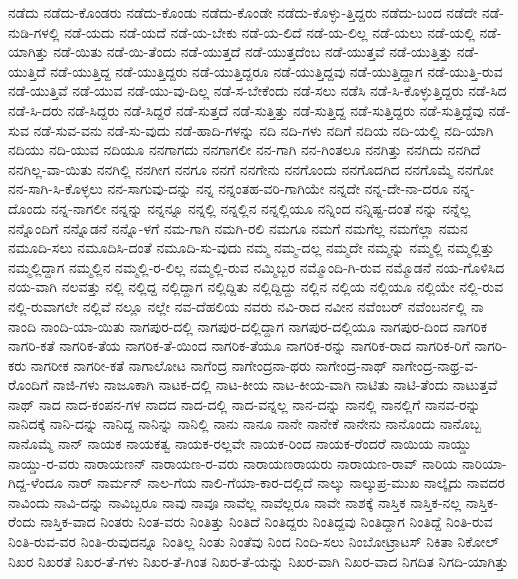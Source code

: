 {ನಡೆದು
ನಡೆದು-ಕೊಂಡರು
ನಡೆದು-ಕೊಂಡು
ನಡೆದು-ಕೊಂಡೇ
ನಡೆದು-ಕೊಳ್ಳು-ತ್ತಿದ್ದರು
ನಡೆದು-ಬಂದ
ನಡೆದೇ
ನಡೆ-ನುಡಿ-ಗಳಲ್ಲಿ
ನಡೆ-ಯದು
ನಡೆ-ಯದೆ
ನಡೆ-ಯ-ಬೇಕು
ನಡೆ-ಯ-ಲಿದೆ
ನಡೆ-ಯ-ಲಿಲ್ಲ
ನಡೆ-ಯಲು
ನಡೆ-ಯಲ್ಲಿ
ನಡೆ-ಯಾಗಿತ್ತು
ನಡೆ-ಯಿತು
ನಡೆ-ಯಿ-ತೆಂದು
ನಡೆ-ಯುತ್ತದೆ
ನಡೆ-ಯುತ್ತದೆಂಬ
ನಡೆ-ಯುತ್ತವೆ
ನಡೆ-ಯುತ್ತಿತ್ತು
ನಡೆ-ಯುತ್ತಿದೆ
ನಡೆ-ಯುತ್ತಿದ್ದ
ನಡೆ-ಯುತ್ತಿದ್ದರು
ನಡೆ-ಯುತ್ತಿದ್ದರೂ
ನಡೆ-ಯುತ್ತಿದ್ದವು
ನಡೆ-ಯುತ್ತಿದ್ದಾಗ
ನಡೆ-ಯುತ್ತಿ-ರುವ
ನಡೆ-ಯುತ್ತಿವೆ
ನಡೆ-ಯುವ
ನಡೆ-ಯು-ವು-ದಿಲ್ಲ
ನಡೆ-ಸ-ಬೇಕೆಂದು
ನಡೆ-ಸಲು
ನಡೆಸಿ
ನಡೆ-ಸಿ-ಕೊಳ್ಳುತ್ತಿದ್ದರು
ನಡೆ-ಸಿದ
ನಡೆ-ಸಿ-ದರು
ನಡೆ-ಸಿದ್ದರು
ನಡೆ-ಸಿದ್ದರೆ
ನಡೆ-ಸುತ್ತದೆ
ನಡೆ-ಸುತ್ತಿತ್ತು
ನಡೆ-ಸುತ್ತಿದ್ದ
ನಡೆ-ಸುತ್ತಿದ್ದರು
ನಡೆ-ಸುತ್ತಿದ್ದೆವು
ನಡೆ-ಸುವ
ನಡೆ-ಸುವ-ವನು
ನಡೆ-ಸು-ವುದು
ನಡೆ-ಹಾದಿ-ಗಳನ್ನು
ನದಿ
ನದಿ-ಗಳು
ನದಿಗೆ
ನದಿಯ
ನದಿ-ಯಲ್ಲಿ
ನದಿ-ಯಾಗಿ
ನದಿಯು
ನದಿ-ಯುವ
ನದಿಯೂ
ನನಗಾಗದು
ನನಗಾಗಲೀ
ನನ-ಗಾಗಿ
ನನ-ಗಿಂತಲೂ
ನನಗಿತ್ತು
ನನಗಿದು
ನನಗಿದೆ
ನನಗಿಲ್ಲ-ವಾ-ಯಿತು
ನನಗಿಲ್ಲಿ
ನನಗೀಗ
ನನಗೂ
ನನಗೆ
ನನಗೇನು
ನನಗೊಂದು
ನನಗೊದಗಿದ
ನನಗೊಮ್ಮೆ
ನನಗೋ
ನನ-ಸಾಗಿ-ಸಿ-ಕೊಳ್ಳಲು
ನನ-ಸಾಗುವು-ದನ್ನು
ನನ್ನ
ನನ್ನಂತಹ-ವರಿ-ಗಾಗಿಯೇ
ನನ್ನದೇ
ನನ್ನ-ದೇ-ನಾ-ದರೂ
ನನ್ನ-ದೊಂದು
ನನ್ನ-ನಾಗಲೀ
ನನ್ನನ್ನು
ನನ್ನನ್ನೂ
ನನ್ನಲ್ಲಿ
ನನ್ನಲ್ಲಿನ
ನನ್ನಲ್ಲಿಯೂ
ನನ್ನಿಂದ
ನನ್ನಿಷ್ಟ-ದಂತೆ
ನನ್ನು
ನನ್ನೆಲ್ಲ
ನನ್ನೊಂದಿಗೆ
ನನ್ನೊಡನೆ
ನನ್ನೊ-ಳಗೆ
ನಮ-ಗಾಗಿ
ನಮಗಿ-ರಲಿ
ನಮಗೂ
ನಮಗೆ
ನಮಗೆಲ್ಲ
ನಮಗೆಲ್ಲಾ
ನಮನ
ನಮೂದಿ-ಸಲು
ನಮೂದಿಸಿ-ದಂತೆ
ನಮೂದಿ-ಸು-ವುದು
ನಮ್ಮ
ನಮ್ಮ-ದಲ್ಲ
ನಮ್ಮದೇ
ನಮ್ಮನ್ನು
ನಮ್ಮಲ್ಲಿ
ನಮ್ಮಲ್ಲಿತ್ತು
ನಮ್ಮಲ್ಲಿದ್ದಾಗ
ನಮ್ಮಲ್ಲಿನ
ನಮ್ಮಲ್ಲಿ-ರ-ಲಿಲ್ಲ
ನಮ್ಮಲ್ಲಿ-ರುವ
ನಮ್ಮಿಬ್ಬರ
ನಮ್ಮೊಂದಿ-ಗಿ-ರುವ
ನಮ್ಮೊಡನೆ
ನಯ-ಗೊಳಿಸಿದ
ನಯ-ವಾಗಿ
ನಲವತ್ತು
ನಲ್ಲಿ
ನಲ್ಲಿದ್ದ
ನಲ್ಲಿದ್ದಾಗ
ನಲ್ಲಿದ್ದಿತು
ನಲ್ಲಿದ್ದಿದ್ದು
ನಲ್ಲಿನ
ನಲ್ಲಿಯ
ನಲ್ಲಿಯೂ
ನಲ್ಲಿಯೇ
ನಲ್ಲಿ-ರುವ
ನಲ್ಲಿ-ರುವಾಗಲೇ
ನಲ್ಲಿವೆ
ನಲ್ಲೂ
ನಲ್ಲೇ
ನವ-ದೆಹಲಿಯ
ನವರು
ನವಿ-ರಾದ
ನವೀನ
ನವೆಂಬರ್
ನವೆಂಬರ್ನಲ್ಲಿ
ನಾ
ನಾಂದಿ
ನಾಂದಿ-ಯಾ-ಯಿತು
ನಾಗಪುರ-ದಲ್ಲಿ
ನಾಗಪುರ-ದಲ್ಲಿದ್ದಾಗ
ನಾಗಪುರ-ದಲ್ಲಿಯೂ
ನಾಗಪುರ-ದಿಂದ
ನಾಗರಿಕ
ನಾಗರಿ-ಕತೆ
ನಾಗರಿಕ-ತೆಯ
ನಾಗರಿಕ-ತೆ-ಯಿಂದ
ನಾಗರಿಕ-ತೆಯೂ
ನಾಗರಿಕ-ರನ್ನು
ನಾಗರಿಕ-ರಾದ
ನಾಗರಿಕ-ರಿಗೆ
ನಾಗರಿ-ಕರು
ನಾಗರೀಕ
ನಾಗರೀ-ಕತೆ
ನಾಗಾಲೋಟ
ನಾಗೆಂದ್ರ
ನಾಗೇಂದ್ರನಾ-ಥರು
ನಾಗೇಂದ್ರ-ನಾಥ್
ನಾಗೇಂದ್ರ-ನಾಥ್ರ-ವ-ರೊಂದಿಗೆ
ನಾಜಿ-ಗಳು
ನಾಜೂಕಾಗಿ
ನಾಟಕ-ದಲ್ಲಿ
ನಾಟ-ಕೀಯ
ನಾಟ-ಕೀಯ-ವಾಗಿ
ನಾಟಿತು
ನಾಟಿ-ತೆಂದು
ನಾಟುತ್ತವೆ
ನಾಥ್
ನಾದ
ನಾದ-ಕಂಪನ-ಗಳ
ನಾದದ
ನಾದ-ದಲ್ಲಿ
ನಾದ-ವನ್ನಲ್ಲ
ನಾನ-ದನ್ನು
ನಾನಲ್ಲಿ
ನಾನಲ್ಲಿಗೆ
ನಾನವ-ರನ್ನು
ನಾನಿದಕ್ಕೆ
ನಾನಿ-ದನ್ನು
ನಾನಿದ್ದ
ನಾನಿನ್ನು
ನಾನಿಲ್ಲಿ
ನಾನು
ನಾನೂ
ನಾನೇ
ನಾನೇಕೆ
ನಾನೇನು
ನಾನೊಂದು
ನಾನೊಬ್ಬ
ನಾನೊಮ್ಮೆ
ನಾನ್
ನಾಯಕ
ನಾಯಕತ್ವ
ನಾಯಕ-ರಲ್ಲವೇ
ನಾಯಕ-ರಿಂದ
ನಾಯಕ-ರೆಂದರೆ
ನಾಯಿಯ
ನಾಯ್ಡು
ನಾಯ್ಡು-ರ-ವರು
ನಾರಾಯಣನ್
ನಾರಾಯಣ-ರ-ವರು
ನಾರಾಯಣರಾಯರು
ನಾರಾಯಣ-ರಾವ್
ನಾರಿಯ
ನಾರಿಯಾ-ಗಿದ್ದ-ಳೆಂದೂ
ನಾರ್
ನಾರ್ಮನ್
ನಾಲ-ಗೆಯ
ನಾಲಿ-ಗೆಯಾ-ಕಾರ-ದಲ್ಲಿದೆ
ನಾಲ್ಕು
ನಾಲ್ಕುಪ್ರ-ಮುಖ
ನಾಲ್ಕೈದು
ನಾವದರ
ನಾವಿಂದು
ನಾವಿ-ದನ್ನು
ನಾವಿಬ್ಬರೂ
ನಾವು
ನಾವೂ
ನಾವೆಲ್ಲ
ನಾವೆಲ್ಲರೂ
ನಾವೇ
ನಾಶಕ್ಕೆ
ನಾಸ್ತಿಕ
ನಾಸ್ತಿಕ-ನಲ್ಲ
ನಾಸ್ತಿಕ-ರೆಂದು
ನಾಸ್ತಿಕ-ವಾದ
ನಿಂತರು
ನಿಂತ-ವರು
ನಿಂತಿತ್ತು
ನಿಂತಿದೆ
ನಿಂತಿದ್ದರು
ನಿಂತಿದ್ದವು
ನಿಂತಿದ್ದಾಗ
ನಿಂತಿದ್ದೆ
ನಿಂತಿ-ರುವ
ನಿಂತಿ-ರುವ-ವರ
ನಿಂತಿ-ರುವುದನ್ನೂ
ನಿಂತಿಲ್ಲ
ನಿಂತು
ನಿಂತೆವು
ನಿಂದ
ನಿಂದಿ-ಸಲು
ನಿಂಬೋಟ್ರಾಟಸ್
ನಿಕಿತಾ
ನಿಕೋಲ್
ನಿಖರ
ನಿಖರತೆ
ನಿಖರ-ತೆ-ಗಳು
ನಿಖರ-ತೆ-ಗಿಂತ
ನಿಖರ-ತೆ-ಯನ್ನು
ನಿಖರ-ವಾಗಿ
ನಿಖರ-ವಾದ
ನಿಗದಿತ
ನಿಗದಿ-ಯಾಗಿತ್ತು
}
